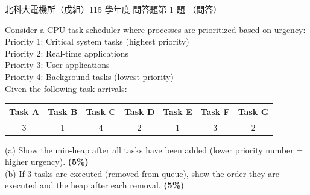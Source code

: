 \begin{pastexam}[label={px:ntut-115-ee-ds-21}]{北科大電機所（戊組）115 學年度 問答題第 1 題}
（問答）

Consider a CPU task scheduler where processes are prioritized based on urgency:\\
Priority 1: Critical system tasks (highest priority)\\
Priority 2: Real-time applications\\
Priority 3: User applications\\
Priority 4: Background tasks (lowest priority)\\
Given the following task arrivals:

\begin{center}
\begin{tabular}{|c|c|c|c|c|c|c|}\hline
Task A & Task B & Task C & Task D & Task E & Task F & Task G\\\hline
3 & 1 & 4 & 2 & 1 & 3 & 2\\\hline
\end{tabular}
\end{center}
(a) Show the min-heap after all tasks have been added (lower priority number = higher urgency).
\textbf{(5\%)}\\
(b) If 3 tasks are executed (removed from queue), show the order they are executed and the heap after
each removal. \textbf{(5\%)}
\end{pastexam}

